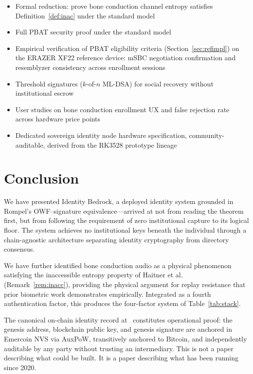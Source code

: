 \documentclass[12pt,a4paper]{article}
\begin{document}
\begin{itemize}
  \item Formal reduction: prove bone conduction channel entropy satisfies
        Definition~\ref{def:inac} under the standard model
  \item Full PBAT security proof under the standard model
  \item Empirical verification of PBAT eligibility criteria
        (Section~\ref{sec:refimpl}) on the ERAZER XF22 reference device:
        mSBC negotiation confirmation and resemblyzer consistency across
        enrollment sessions
  \item Threshold signatures ($k$-of-$n$ ML-DSA) for social recovery
        without institutional escrow
  \item User studies on bone conduction enrollment UX and false rejection
        rate across hardware price points
  \item Dedicated sovereign identity node hardware specification,
        community-auditable, derived from the RK3528 prototype lineage
\end{itemize}

\section*{Conclusion}

We have presented Identity Bedrock, a deployed identity system grounded
in Rompel's OWF--signature equivalence---arrived at not from reading the
theorem first, but from following the requirement of zero institutional
capture to its logical floor. The system achieves no institutional keys
beneath the individual through a chain-agnostic architecture separating
identity cryptography from directory consensus.

We have further identified bone conduction audio as a physical phenomenon
satisfying the inaccessible entropy property of Haitner et
al.~\cite{Haitner10} (Remark~\ref{rem:inacc}), providing the physical
argument for replay resistance that prior biometric work demonstrates
empirically. Integrated as a fourth authentication factor, this produces
the four-factor system of Table~\ref{tab:stack}.

The canonical on-chain identity record at~\cite{NESSFiber} constitutes
operational proof: the genesis address, blockchain public key, and
genesis signature are anchored in Emercoin NVS via AuxPoW, transitively
anchored to Bitcoin, and independently auditable by any party without
trusting an intermediary. This is not a paper describing what could be
built. It is a paper describing what has been running since 2020.
\end{document}
